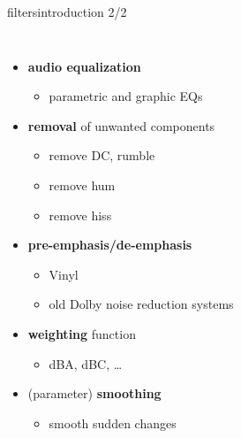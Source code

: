 	\begin{frame}{filters}{introduction 2/2}
        \vspace{-9mm}
        \begin{columns}
                \begin{itemize}
                    \item   \textbf{audio equalization}
                        \begin{itemize}
                            \item   parametric and graphic EQs
                        \end{itemize}
                    \smallskip
                    \item<2->   \textbf{removal} of unwanted components
                        \begin{itemize}
                            \item   remove DC, rumble
                            \item   remove hum
                            \item   remove hiss
                        \end{itemize}
                    \smallskip
                    \item<3->   \textbf{pre-emphasis/de-emphasis}
                        \begin{itemize}
                            \item   Vinyl
                            \item   old Dolby noise reduction systems
                        \end{itemize}
                    \smallskip
                    \item<4->   \textbf{weighting} function
                        \begin{itemize}
                            \item   dBA, dBC, \ldots
                        \end{itemize}
                    \smallskip
                    \item<5->   (parameter) \textbf{smoothing}
                        \begin{itemize}
                            \item   smooth sudden changes
                        \end{itemize}
                \end{itemize}
                \vspace{70mm}

\end{columns}
\end{frame}
